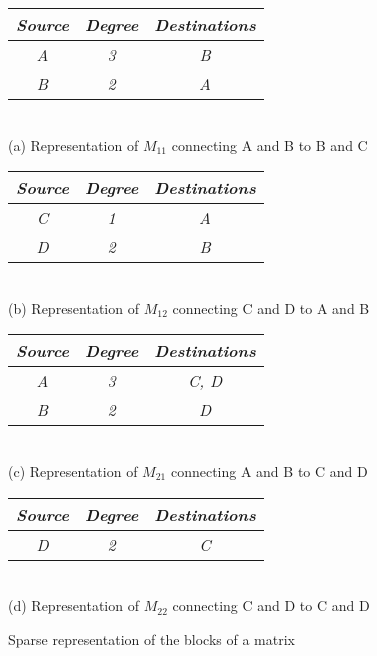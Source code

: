 \begin{figure}[H]
\centering
\begin{tabular}{|c|c|c|}
  \hline
  \textit{Source} & \textit{Degree} & \textit{Destinations} \\
  \hline
  \textit{A} & \textit{3} & \textit{B} \\
  \textit{B} & \textit{2} & \textit{A} \\
  \hline
\end{tabular}
\captionsetup{justification=centering}\\
\addvspace{1em}
\textrm{(a) Representation of $M_{11}$ connecting A and B to B and C}

\addvspace{2em}
\begin{tabular}{|c|c|c|}
  \hline
  \textit{Source} & \textit{Degree} & \textit{Destinations} \\
  \hline
  \textit{C} & \textit{1} & \textit{A} \\
  \textit{D} & \textit{2} & \textit{B} \\
  \hline
\end{tabular}
\captionsetup{justification=centering}\\
\addvspace{1em}
\textrm{(b) Representation of $M_{12}$ connecting C and D to A and B}

\addvspace{2em}
\begin{tabular}{|c|c|c|}
  \hline
  \textit{Source} & \textit{Degree} & \textit{Destinations} \\
  \hline
  \textit{A} & \textit{3} & \textit{C, D} \\
  \textit{B} & \textit{2} & \textit{D} \\
  \hline
\end{tabular}
\captionsetup{justification=centering}\\
\addvspace{1em}
\textrm{(c) Representation of $M_{21}$ connecting A and B to C and D}

\addvspace{2em}
\begin{tabular}{|c|c|c|}
  \hline
  \textit{Source} & \textit{Degree} & \textit{Destinations} \\
  \hline
  \textit{D} & \textit{2} & \textit{C} \\
  \hline
\end{tabular}
\captionsetup{justification=centering}\\
\addvspace{1em}
\textrm{(d) Representation of $M_{22}$ connecting C and D to C and D}

\caption{Sparse representation of the blocks of a matrix}
\label{fig:sparse-representation-blocks-matrix}
\end{figure}

